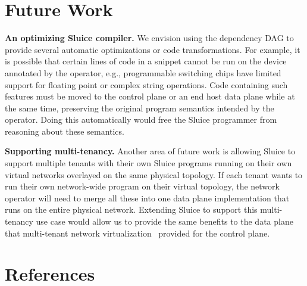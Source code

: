\section{Future Work}
\textbf{An optimizing Sluice compiler.} We envision using the dependency DAG to
provide several automatic optimizations or code transformations. For example,
it is possible that certain lines of code in a snippet cannot be run on the
device annotated by the operator, e.g., programmable switching chips have
limited support for floating point or complex string operations. Code
containing such features must be moved to the control plane or an end host data
plane while at the same time, preserving the original program semantics
intended by the operator. Doing this automatically would free the Sluice
programmer from reasoning about these semantics.

\textbf{Supporting multi-tenancy.} Another area of future work is allowing
Sluice to support multiple tenants with their own Sluice programs running on
their own virtual networks overlayed on the same physical topology. If each
tenant wants to run their own network-wide program on their virtual topology,
the network operator will need to merge all these into one data plane
implementation that runs on the entire physical network. Extending Sluice to
support this multi-tenancy use case would allow us to provide the same benefits
to the data plane that multi-tenant network virtualization~\cite{nvp} provided
for the control plane.

\section{References}
